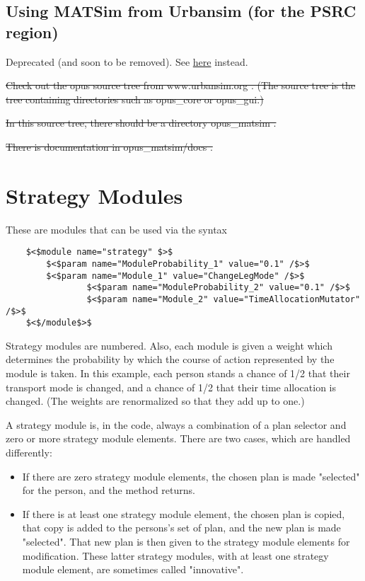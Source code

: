 \documentclass[a4paper,11pt]{report}
\begin{document}
\vfill\eject
\section{Using MATSim from Urbansim (for the PSRC region)}

Deprecated (and soon to be removed). See \href{http://matsim.org/extensions/matsim4urbansim}{here} instead.



\sout{Check  out the opus source tree from www.urbansim.org . (The source tree  is the tree containing directories such as opus\_core or opus\_gui.)}

\sout{In this source tree, there should be a directory opus\_matsim .}

\sout{There is documentation in opus\_matsim/docs .}


\chapter{Strategy Modules}


These are modules that can be used via the syntax
\begin{verbatim}
	$<$module name="strategy" $>$
		$<$param name="ModuleProbability_1" value="0.1" /$>$
		$<$param name="Module_1" value="ChangeLegMode" /$>$
                $<$param name="ModuleProbability_2" value="0.1" /$>$
                $<$param name="Module_2" value="TimeAllocationMutator" /$>$
	$<$/module$>$
\end{verbatim}


Strategy modules are numbered. Also, each  module is given a weight which determines the probability by which the  course of action represented by the module is taken. In this example,  each person stands a chance of 1/2 that their transport mode is changed,  and a chance of 1/2 that their time allocation is changed. (The  weights are renormalized so that they add up to one.)

A strategy module is, in the code, always a combination of a plan  selector and zero or more strategy module elements. There are two cases,  which are handled differently:
\begin{itemize}
	\item If there are zero strategy module elements, the chosen plan is made "selected" for the person, and the method returns.
	\item If there is at least one strategy module element, the chosen plan is  copied, that copy is added to the persons's set of plan, and the new  plan is made "selected". That new plan is then given to the  strategy module elements for modification. These latter strategy  modules, with at least one strategy module element, are sometimes called  "innovative".
\end{itemize}
\end{document}
